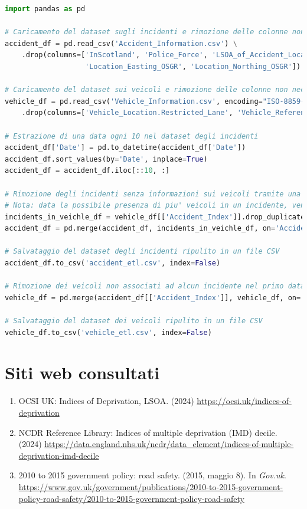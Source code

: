 \documentclass{article}
\begin{document}
\begin{lstlisting}[language= Python, caption=Operazioni di ETL con Pandas, label=code001]
import pandas as pd

# Caricamento del dataset sugli incidenti e rimozione delle colonne non necessarie
accident_df = pd.read_csv('Accident_Information.csv') \
    .drop(columns=['InScotland', 'Police_Force', 'LSOA_of_Accident_Location',
                   'Location_Easting_OSGR', 'Location_Northing_OSGR'])

# Caricamento del dataset sui veicoli e rimozione delle colonne non necessarie
vehicle_df = pd.read_csv('Vehicle_Information.csv', encoding="ISO-8859-1") \
    .drop(columns=['Vehicle_Location.Restricted_Lane', 'Vehicle_Reference'])

# Estrazione di una data ogni 10 nel dataset degli incidenti
accident_df['Date'] = pd.to_datetime(accident_df['Date'])
accident_df.sort_values(by='Date', inplace=True)
accident_df = accident_df.iloc[::10, :]

# Rimozione degli incidenti senza informazioni sui veicoli tramite una inner join
# Nota: data la possibile presenza di piu' veicoli in un incidente, vengono rimossi i duplicati prima di eseguire il merge, in modo da non presentare duplicati nelle righe del primo dataset
incidents_in_veichle_df = vehicle_df[['Accident_Index']].drop_duplicates(subset='Accident_Index')
accident_df = pd.merge(accident_df, incidents_in_veichle_df, on='Accident_Index', how='inner')

# Salvataggio del dataset degli incidenti ripulito in un file CSV
accident_df.to_csv('accident_etl.csv', index=False)

# Rimozione dei veicoli non associati ad alcun incidente nel primo dataset mediante una inner join
vehicle_df = pd.merge(accident_df[['Accident_Index']], vehicle_df, on='Accident_Index', how='inner')

# Salvataggio del dataset dei veicoli ripulito in un file CSV
vehicle_df.to_csv('vehicle_etl.csv', index=False)
\end{lstlisting}

\clearpage

\clearpage

\clearpage


\clearpage
\section*{Siti web consultati}

\begin{enumerate}
    \item OCSI UK: Indices of Deprivation, LSOA. (2024) \url{https://ocsi.uk/indices-of-deprivation}
    \item NCDR Reference Library: Indices of multiple deprivation (IMD) decile. (2024) \url{https://data.england.nhs.uk/ncdr/data_element/indices-of-multiple-deprivation-imd-decile}
    \item 2010 to 2015 government policy: road safety. (2015, maggio 8). In \textit{Gov.uk}. \url{https://www.gov.uk/government/publications/2010-to-2015-government-policy-road-safety/2010-to-2015-government-policy-road-safety}
\end{enumerate}

\end{document}
